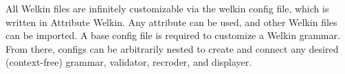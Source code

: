 \begin{itemize}
All Welkin files are infinitely customizable via the welkin config file, which is written in Attribute Welkin. Any attribute can be used, and other Welkin files can be imported. A base config file is required to customize a Welkin grammar. From there, configs can be arbitrarily nested to create and connect any desired (context-free) grammar, validator, recroder, and displayer.



\end{itemize}
